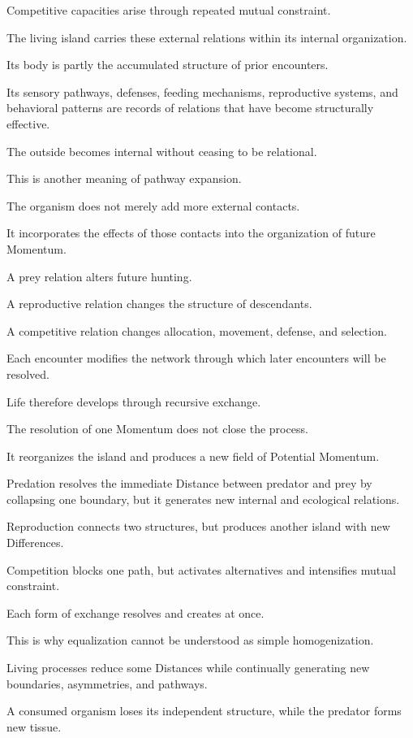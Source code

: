 Competitive capacities arise through repeated mutual constraint.

The living island carries these external relations within its internal organization.

Its body is partly the accumulated structure of prior encounters.

Its sensory pathways, defenses, feeding mechanisms, reproductive systems, and behavioral patterns are records of relations that have become structurally effective.

The outside becomes internal without ceasing to be relational.

This is another meaning of pathway expansion.

The organism does not merely add more external contacts.

It incorporates the effects of those contacts into the organization of future Momentum.

A prey relation alters future hunting.

A reproductive relation changes the structure of descendants.

A competitive relation changes allocation, movement, defense, and selection.

Each encounter modifies the network through which later encounters will be resolved.

Life therefore develops through recursive exchange.

The resolution of one Momentum does not close the process.

It reorganizes the island and produces a new field of Potential Momentum.

Predation resolves the immediate Distance between predator and prey by collapsing one boundary, but it generates new internal and ecological relations.

Reproduction connects two structures, but produces another island with new Differences.

Competition blocks one path, but activates alternatives and intensifies mutual constraint.

Each form of exchange resolves and creates at once.

This is why equalization cannot be understood as simple homogenization.

Living processes reduce some Distances while continually generating new boundaries, asymmetries, and pathways.

A consumed organism loses its independent structure, while the predator forms new tissue.

